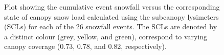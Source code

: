 \documentclass[
  letterpaper,
  DIV=11,
  numbers=noendperiod]{scrartcl}
\begin{document}
\begin{figure}[H]


\caption{\label{fig-scl-w-sf}Plot showing the cumulative event snowfall
versus the corresponding state of canopy snow load calculated using the
subcanopy lysimeters (SCLs) for each of the 26 snowfall events. The SCLs
are denoted by a distinct colour (grey, yellow, and green), correspond
to varying canopy coverage (0.73, 0.78, and 0.82, respectively).}

\end{figure}%

\pagebreak
{}
\end{document}
